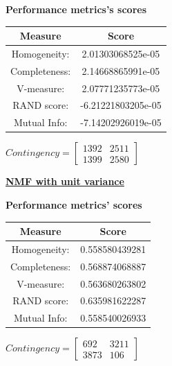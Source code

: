 \documentclass{article}
\begin{document}
\begin{center}
	\textbf{Performance metrics's scores} \\ \vspace{10pt}	
	\begin{tabular}{*{2}{c}}
		\toprule
		\textbf{Measure} & \textbf{Score} \\		
		\midrule
		Homogeneity: 		& 2.01303068525e-05 \\
		\midrule
		Completeness: 		& 2.14668865991e-05 \\
		\midrule
		V-measure: 			& 2.07771235773e-05 \\
		\midrule
		RAND score: 		& -6.21221803205e-05 \\
		\midrule
		Mutual Info: 		& -7.14202926019e-05 \\
		\bottomrule
	\end{tabular}
	\qquad
	$Contingency = \left[\begin{array}{*{2}{c}}
		1392 		& 2511 \\
		1399 		& 2580 
			\end{array}\right]
		$
\end{center}

\newpage

\underline{\textbf{NMF with unit variance}} 

\begin{center}
	\textbf{Performance metrics' scores} \\ \vspace{10pt}		
	\begin{tabular}{*{2}{c}}	
		\toprule
		\textbf{Measure} & \textbf{Score} \\		
		\midrule
		Homogeneity: 		& 0.558580439281 \\
		\midrule
		Completeness: 		& 0.568874068887 \\
		\midrule
		V-measure: 			& 0.563680263802 \\
		\midrule
		RAND score: 		& 0.635981622287 \\
		\midrule
		Mutual Info: 		& 0.558540026933 \\
		\bottomrule
	\end{tabular}
	\qquad	
	$Contingency = \left[ \begin{array}{*{2}{c}}
		692 		& 3211 \\
		3873  		& 106 
			\end{array}\right]
		$
\end{center}

\\ \vspace{20pt}
\end{document}
